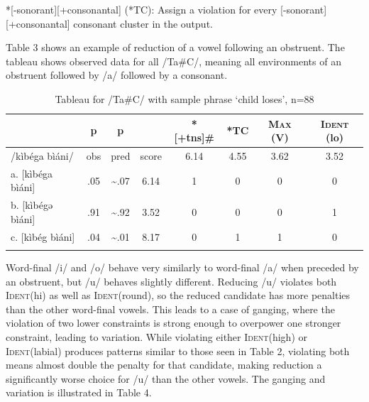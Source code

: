 \documentclass[output=paper,newtxmath,modfonts,nonflat,draftmode]{langsci/langscibook}
\begin{document}
\ea \label{tc}
*[-sonorant][+consonantal] (*TC): Assign a violation for every
	[-sonorant][+consonantal] consonant cluster in the output. 
\z

Table 3 shows an example of reduction of a vowel following an obstruent. The tableau shows observed data for all /Ta\#C/, meaning all environments of an obstruent followed by /a/ followed by a consonant. 

\begin{table}
\caption{Tableau for /Ta\#C/ with sample phrase ‘child loses’, n=88}
\label{tab:baird:3}
\begin{tabularx}{\textwidth}{Xccccccc} 
\lsptoprule

{} &  p   &  p   &    &   *[+tns]\#   &   *TC   &   \textsc{Max} (V)   &   \textsc{Ident} (lo)  \\
\midrule
   /kìbéga bìáni/ & obs & pred & score & 6.14 & 4.55 & 3.62 & 3.52 \\
{a. [kìbéga bìáni]} & .05 & \textasciitilde .07 & 6.14 & 1 & 0 & 0 & 0 \\
{b. [kìbégə bìáni]} & .91 & \textasciitilde .92 & 3.52 & 0 & 0 & 0 & 1 \\
{c. [kìbég bìáni]} & .04 & \textasciitilde .01 & 8.17 & 0 & 1 & 1 & 0 \\
\lspbottomrule\end{tabularx}
\end{table}


Word-final /i/ and /o/ behave very similarly to word-final /a/ when preceded by 
an obstruent, but /u/ behaves slightly different. Reducing /u/ violates both 
\textsc{Ident}(hi) as well as \textsc{Ident}(round), so the reduced candidate 
has more penalties than the other word-final vowels. This leads to a case of 
ganging, where the violation of two lower constraints is strong enough to overpower one stronger constraint, leading to variation. While violating either \textsc{Ident}(high) or \textsc{Ident}(labial) produces patterns similar to those seen in Table 2, violating both means almost double the penalty for that candidate, making reduction a significantly worse choice for /u/ than the other vowels. The ganging and variation is 
illustrated in Table 4. 
\end{document}
